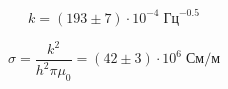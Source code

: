 \begin{figure}[ht!]
\end{figure}

\[
    k = \left(193 \pm 7\right)\cdot 10^{-4}\;\text{Гц}^{-0.5}
\]

\[
    \sigma = \frac{k^2}{h^2 \pi\mu_0} = \left(42 \pm 3\right)\cdot 10^{6}\;\text{См} / \text{м}
\]

\begin{figure}[ht!]
\end{figure}
\begin{figure}[ht!]
\end{figure}

